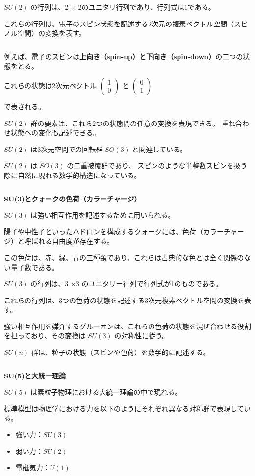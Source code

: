 \documentclass[uplatex,a4j,12pt,dvipdfmx]{jsarticle}
\begin{document}
$SU(2)$ の行列は、2 $\times$ 2のユニタリ行列であり、行列式は1である。

これらの行列は、電子のスピン状態を記述する2次元の複素ベクトル空間（スピノル空間）の変換を表す。

${}$

例えば、電子のスピンは\textbf{上向き（spin-up）と下向き（spin-down）}の二つの状態をとる。

これらの状態は2次元ベクトル
$
	\begin{pmatrix} 1 \\
		0\end{pmatrix}
$
と
$
	\begin{pmatrix} 0 \\
		1\end{pmatrix}
$

で表される。

$SU(2)$ 群の要素は、これら2つの状態間の任意の変換を表現できる。
重ね合わせ状態への変化も記述できる。

$SU(2)$ は3次元空間での回転群 $SO(3)$ と関連している。

$SU(2)$ は $SO(3)$ の二重被覆群であり、
スピンのような半整数スピンを扱う際に自然に現れる数学的構造になっている。

${}$

\textbf{SU(3)とクォークの色荷（カラーチャージ）}

$SU(3)$ は強い相互作用を記述するために用いられる。

陽子や中性子といったハドロンを構成するクォークには、色荷（カラーチャージ）と呼ばれる自由度が存在する。

この色荷は、赤、緑、青の三種類であり、これらは古典的な色とは全く関係のない量子数である。

$SU(3)$ の行列は、3 $\times$3 のユニタリー行列で行列式が1のものである。

これらの行列は、3つの色荷の状態を記述する3次元複素ベクトル空間の変換を表す。

強い相互作用を媒介するグルーオンは、これらの色荷の状態を混ぜ合わせる役割を担っており、その変換は $SU(3)$ の対称性に従う。

$SU(n)$ 群は、粒子の状態（スピンや色荷）を数学的に記述する。


${}$

\textbf{SU(5)と大統一理論}

$SU(5)$ は素粒子物理における大統一理論の中で現れる。

標準模型は物理学における力を以下のようにそれぞれ異なる対称群で表現している。
\begin{itemize}
	\item 強い力：$SU(3)$
	\item 弱い力：$SU(2)$
	\item 電磁気力：$U(1)$
\end{itemize}
\end{document}
